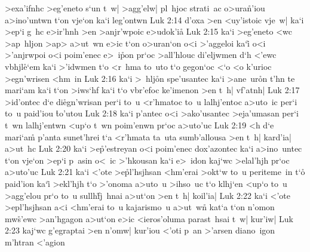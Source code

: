>exa'ifnhc
>eg'eneto
s`un
t~w|
>agg'elw|
pl~hjoc
strati~ac
o>ura\r{n}'iou
a>ino'untwn
t`on
vje`on
ka`i
leg'ontwn\bibvsend
\vs Luk 2:14
d'oxa
>en
<uy'istoic
vje~w|
ka`i
>ep`i
g~hc
e>ir'hnh
>en
>anjr'wpoic
e>udok'i\r{a}\bibvsend
{}
\vs Luk 2:15
ka`i
>eg'eneto
<wc
>ap~hljon
>ap>
a>ut~wn
e>ic
t`on
o>uran`on
o<i
>'aggeloi
ka`i\r{}
o<i
>'anjrwpoi
o<i
poim'enec
e>~i\r{p}on
pr`oc
>all'hlouc
di'eljwmen
d`h
<'ewc
vbhjl\r{e}`em
ka`i
>'idwmen
t`o
<r~hma
to~uto
t`o
gegon`oc
<`o
<o
k'urioc
>egn'wrisen
<hm~in\bibvsend
\vs Luk 2:16
ka`i
>~hlj\r{o}n
spe'usantec
ka`i
>ane~ur\r{o}n
t'hn
te
mari`am
ka`i
t`on
>iws`hf
ka`i
t`o
vbr'efoc
ke'imenon
>en
t~h|
vf'atnh|\bibvsend
\vs Luk 2:17
>id'ontec
d`e
di\r{e}gn'wrisan
per`i
to~u
<r'hmatoc
to~u
lalhj'entoc
a>uto~ic
per`i
to~u
paid'iou
\r{t}o'utou\bibvsend
{}
\vs Luk 2:18
ka`i
p'antec
o<i
>ako'usantec
>eja'umasan
per`i
t~wn
lalhj'entwn
<up`o
t~wn
poim'enwn
pr`oc
a>uto'uc\bibvsend
\vs Luk 2:19
<h
d`e
mari`a\r{m}
p'anta
sunet'hrei
t`a
<r'hmata
ta~uta
sumb'allousa
>en
t~h|
kard'ia|
a>ut~hc\bibvsend
\vs Luk 2:20
ka`i
>e\r{p}'estreyan
o<i
poim'enec
dox'azontec
ka`i
a>ino~untec
t`on
vje`on
>ep`i
p~asin
o<~ic
>'hkousan
ka`i
e>~idon
kaj`wc
>elal'hjh
pr`oc
a>uto'uc\bibvsend
\vs Luk 2:21
ka`i
<'ote
>e\r{p}l'hsjhsan
<hm'erai
>okt`w
to~u
periteme~in
t`o\r{}
paid'ion
ka`i\r{}
>ekl'hjh
t`o
>'onoma
a>uto~u
>ihso~uc
t`o
klhj`en
<up`o
to~u
>agg'elou
pr`o
to~u
sullh\r{f}j~hnai
a>ut`on
>en
t~h|
koil'ia|\bibvsend
\vs Luk 2:22
ka`i
<'ote
>epl'hsjhsan
a<i
<hm'erai
to~u
kajarismo~u
a>ut~w\r{n}
kat`a
t`on
n'omon
mw\r{s}'ewc
>an'hgagon
a>ut`on
e>ic
<ieros'oluma
parast~hsai
t~w|
kur'iw|\bibvsend
\vs Luk 2:23
kaj`wc
g'egraptai
>en
n'omw|
kur'iou
<'oti
p~an
>'arsen
diano~igon
m'htran
<'agion
